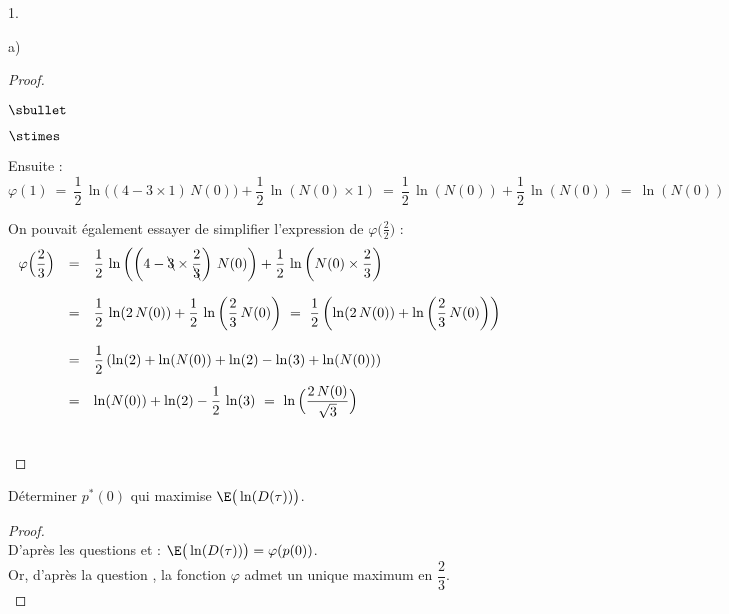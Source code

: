 \documentclass[11pt]{article}%
\begin{document}
\begin{noliste}{1.}
\begin{noliste}{a)}
\begin{proof}
\begin{noliste}{$\sbullet$}
\begin{noliste}{$\stimes$}
	\item Ensuite :
	\[
	  \varphi(1) \ = \ \dfrac{1}{2} \, \ln\big( (4-3\times 1) \,
	  N(0)\big) + \dfrac{1}{2} \, \ln(N(0) \times 1) \ = \
	  \dfrac{1}{2} \, \ln(N(0)) + \dfrac{1}{2} \, \ln(N(0))
	  \ = \ \ln(N(0))
	\]
      \end{noliste}
      \end{noliste}
      
      \begin{remark}
        On pouvait également essayer de simplifier l'expression de 
        $\varphi\big(\frac{2}{2}\big)$ :
        \[
          \begin{array}{rcl}
            \varphi\Big(\dfrac{2}{3}\Big) &=& \dfrac{1}{2} \, \ln\left( 
	    \left(4 - \bcancel{3} \times \dfrac{2}{\bcancel{3}}\right) 
	    \, N(0)\right) + \dfrac{1}{2} \, \ln\left(N(0) \times 
	    \dfrac{2}{3}\right)
	    \\[.6cm]
	    &=& \dfrac{1}{2} \, \ln(2 \, N(0)) + \dfrac{1}{2} \, \ln
	    \left( \dfrac{2}{3} \, N(0)\right) \ = \ \dfrac{1}{2}
	    \left(\ln(2 \, N(0)) + \ln\left(\dfrac{2}{3} \, N(0)\right)
	    \right)
	    \\[.6cm]
	    &=& \dfrac{1}{2} \left( \ln(2) + \ln(N(0)) + \ln(2) - \ln(3)
	    + \ln(N(0)) \right)
	    \\[.4cm]
	    &=& \ln(N(0)) + \ln(2) - \dfrac{1}{2} \, \ln(3)
	    \ = \ \ln\Big( \dfrac{2 \, N(0)}{\sqrt{3}}\Big)
          \end{array}
        \]
      \end{remark}~\\[-1.4cm]
    \end{proof}
    
    
    \newpage

    
    \item Déterminer $p^*(0)$ qui maximise $\E\big(\ln(D(\tau))\big)$.
    
    \begin{proof}~\\
      D'après les questions  et  : $\E\big(
      \ln(D(\tau))\big) = \varphi(p(0))$.\\
      Or, d'après la question , la fonction $\varphi$
      admet un unique maximum en $\dfrac{2}{3}$.
      ~\\[-1cm]
    \end{proof}
  \end{noliste}
\end{noliste}
\end{document}
